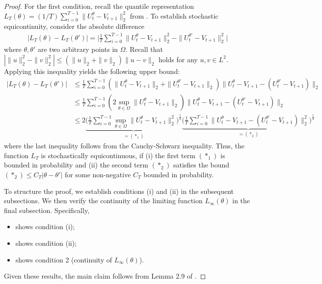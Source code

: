 \documentclass[a4paper, 11pt]{article}
\theoremstyle{definition}
\begin{document}
\begin{proof}
    For the first condition, recall the quantile representation $L_T(\theta) = (1 / T) \sum_{i=0}^{T-1} \| U_t^{\theta} - V_{t+1} \|_2^2$ from .
    To establish stochastic equicontinuity, consider the absolute difference 
    \begin{align}
        \big| L_T(\theta) - L_T(\theta') \big| = \bigg| \frac{1}{T} \sum_{i=0}^{T-1} \| U_t^{\theta} - V_{t+1} \|_2^2 - \| U_t^{\theta'} - V_{t+1} \|_2^2 \bigg| 
    \end{align}
    where $\theta, \theta'$ are two arbitrary points in $\Omega$.
    Recall that $| \| u \|_2^2 - \| v \|_2^2 | \leq ( \|u\|_2 + \|v\|_2 ) \| u - v \|_2$ holds for any $u, v \in L^2$.
    Applying this inequality yields the following upper bound:
    \begin{align}
        \big| L_T(\theta) - L_T(\theta') \big| & \le \frac{1}{T} \sum_{i=0}^{T-1} \left( \| U_t^{\theta} - V_{t+1} \|_2 + \| U_t^{\theta'} - V_{t+1} \|_2 \right) \| U_t^{\theta}  - V_{t+1} - ( U_t^{\theta'} - V_{t+1} ) \|_2 \\
        & \le \frac{1}{T} \sum_{i=0}^{T-1} \left( 2 \sup_{\theta \in \Omega}  \| U_t^{\theta} - V_{t+1} \|_2 \right) \| U_t^{\theta}  - V_{t+1} - ( U_t^{\theta'} - V_{t+1} ) \|_2 \\
        & \le 2 \underbrace{ \bigg( \frac{1}{T} \sum_{i=0}^{T-1} \sup_{\theta \in \Omega} \| U_t^{\theta} - V_{t+1} \|_2^2 \bigg)^{\frac{1}{2}} }_{ = (*_1) } \underbrace{ \bigg( \frac{1}{T} \sum_{i=0}^{T-1} \| U_t^{\theta}  - V_{t+1} - ( U_t^{\theta'} - V_{t+1} ) \|_2^2 \bigg)^{\frac{1}{2}} }_{ = (*_2) } 
    \end{align}
    where the last inequality follows from the Cauchy-Schwarz inequality.
    Thus, the function $L_T$ is stochastically equicontinuous, if (i) the first term $(*_1)$ is bounded in probability and (ii) the second term $(*_2)$ satisfies the bound $(*_2) \le C_T | \theta - \theta' |$ for some non-negative $C_T$ bounded in probability.
    
    To structure the proof, we establish conditions (i) and (ii) in the subsequent subsections.
    We then verify the continuity of the limiting function $L_\infty(\theta)$ in the final subsection.
    Specifically,
    \begin{itemize}
        \item {} shows condition (i);
        \item {} shows condition (ii);
        \item {} shows condition 2 (continuity of $L_\infty(\theta)$).
    \end{itemize}
    Given these results, the main claim follows from Lemma 2.9 of \cite{Newey1994}.
\end{proof}  
    
\end{document}
